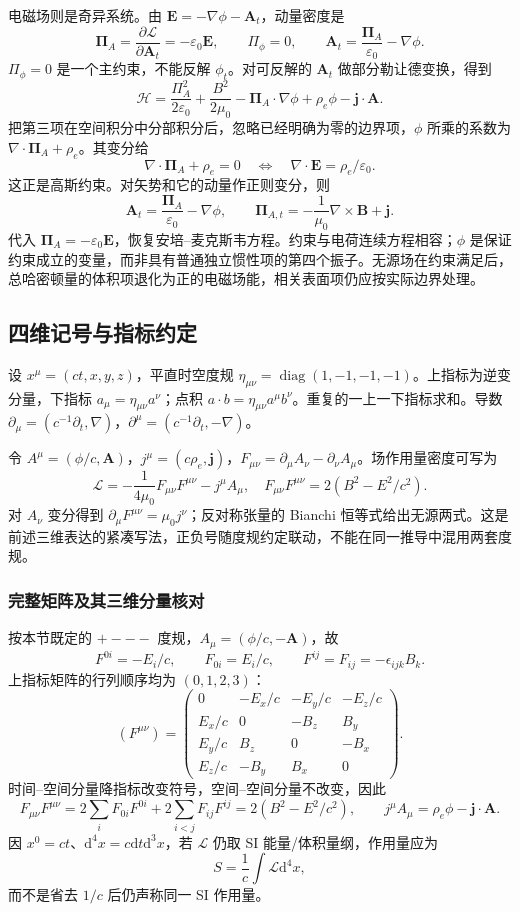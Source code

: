 \documentclass[UTF8,zihao=-4,fontset=fandol,a4paper]{ctexart}
\newcommand{\vect}[1]{\bm{#1}}\newcommand{\dd}{\mathrm d}\newcommand{\pd}{\partial}
\begin{document}
电磁场则是奇异系统。由 $\vect E=-\nabla\phi-\vect A_t$，动量密度是
\[
\vect\Pi_A=\frac{\partial\mathcal L}{\partial\vect A_t}=-\varepsilon_0\vect E,
\qquad \Pi_\phi=0,\qquad
\vect A_t=\frac{\vect\Pi_A}{\varepsilon_0}-\nabla\phi.
\]
$\Pi_\phi=0$ 是一个主约束，不能反解 $\phi_t$。对可反解的 $\vect A_t$ 做部分勒让德变换，得到
\[
\mathcal H=\frac{\Pi_A^2}{2\varepsilon_0}+\frac{B^2}{2\mu_0}
-\vect\Pi_A\cdot\nabla\phi+\rho_e\phi-\vect j\cdot\vect A.
\]
把第三项在空间积分中分部积分后，忽略已经明确为零的边界项，$\phi$ 所乘的系数为 $\nabla\cdot\vect\Pi_A+\rho_e$。其变分给
\[
\nabla\cdot\vect\Pi_A+\rho_e=0
\quad\Longleftrightarrow\quad
\nabla\cdot\vect E=\rho_e/\varepsilon_0.
\]
这正是高斯约束。对矢势和它的动量作正则变分，则
\[
\vect A_t=\frac{\vect\Pi_A}{\varepsilon_0}-\nabla\phi,
\qquad
\vect\Pi_{A,t}=-\frac1{\mu_0}\nabla\times\vect B+\vect j.
\]
代入 $\vect\Pi_A=-\varepsilon_0\vect E$，恢复安培--麦克斯韦方程。约束与电荷连续方程相容；$\phi$ 是保证约束成立的变量，而非具有普通独立惯性项的第四个振子。无源场在约束满足后，总哈密顿量的体积项退化为正的电磁场能，相关表面项仍应按实际边界处理。

\subsection{四维记号与指标约定}
设 $x^\mu=(ct,x,y,z)$，平直时空度规 $\eta_{\mu\nu}=\operatorname{diag}(1,-1,-1,-1)$。上指标为逆变分量，下指标 $a_\mu=\eta_{\mu\nu}a^\nu$；点积 $a\cdot b=\eta_{\mu\nu}a^\mu b^\nu$。重复的一上一下指标求和。导数 $\partial_\mu=(c^{-1}\partial_t,\nabla)$，$\partial^\mu=(c^{-1}\partial_t,-\nabla)$。

令 $A^\mu=(\phi/c,\vect A)$，$j^\mu=(c\rho_e,\vect j)$，$F_{\mu\nu}=\partial_\mu A_\nu-\partial_\nu A_\mu$。场作用量密度可写为
\[
\mathcal L=-\frac1{4\mu_0}F_{\mu\nu}F^{\mu\nu}-j^\mu A_\mu,
\quad F_{\mu\nu}F^{\mu\nu}=2(B^2-E^2/c^2).
\]
对 $A_\nu$ 变分得到 $\partial_\mu F^{\mu\nu}=\mu_0j^\nu$；反对称张量的 Bianchi 恒等式给出无源两式。这是前述三维表达的紧凑写法，正负号随度规约定联动，不能在同一推导中混用两套度规。

\subsubsection*{完整矩阵及其三维分量核对}
按本节既定的 $+---$ 度规，$A_\mu=(\phi/c,-\vect A)$，故
\[
F^{0i}=-E_i/c,\qquad F_{0i}=E_i/c,
\qquad F^{ij}=F_{ij}=-\epsilon_{ijk}B_k.
\]
上指标矩阵的行列顺序均为 $(0,1,2,3)$：
\[
(F^{\mu\nu})=
\begin{pmatrix}
0&-E_x/c&-E_y/c&-E_z/c\\
E_x/c&0&-B_z&B_y\\
E_y/c&B_z&0&-B_x\\
E_z/c&-B_y&B_x&0
\end{pmatrix}.
\]
时间--空间分量降指标改变符号，空间--空间分量不改变，因此
\[
F_{\mu\nu}F^{\mu\nu}
=2\sum_iF_{0i}F^{0i}+2\sum_{i<j}F_{ij}F^{ij}
=2(B^2-E^2/c^2),\qquad
j^\mu A_\mu=\rho_e\phi-\vect j\cdot\vect A.
\]
因 $x^0=ct$、$\dd^4x=c\dd t\dd^3x$，若 $\mathcal L$ 仍取 SI 能量/体积量纲，作用量应为
\[
S=\frac1c\int\mathcal L\dd^4x,
\]
而不是省去 $1/c$ 后仍声称同一 SI 作用量。
\end{document}
